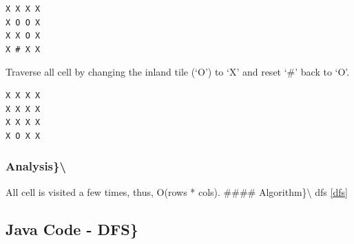 \documentclass[]{book}
\begin{document}
\begin{verbatim}
X X X X
X O O X
X X O X
X # X X
\end{verbatim}

Traverse all cell by changing the inland tile (`O') to `X' and reset `\#' back to `O'.

\begin{verbatim}
X X X X
X X X X
X X X X
X O X X
\end{verbatim}

\hypertarget{analysis-55}{%
\subsubsection{Analysis\}\textbackslash{}}\label{analysis-55}}

All cell is visited a few times, thus, O(rows * cols).
\#\#\#\# Algorithm\}\textbackslash{}
dfs \ref{dfs}

\hypertarget{java-code---dfs-2}{%
\subsection{Java Code - DFS\}}\label{java-code---dfs-2}}
\end{document}
